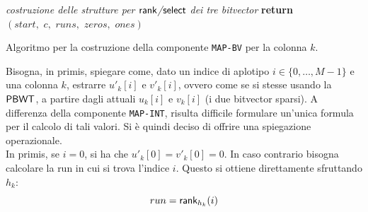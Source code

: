 \begin{algorithm}
\begin{algorithmic}[1]
    \State \textit{costruzione delle strutture per $\mbox{\rm {\sf rank}}$/$\mbox{\rm {\sf select}}$ dei tre
    bitvector} 
    \State \textbf{return}
    $(start,\,\,c,\,\,runs,\,\,zeros,\,\,ones)$  
    \EndFunction
  \end{algorithmic}
  \caption{\footnotesize{Algoritmo per la costruzione della componente
  \texttt{MAP-BV} per la colonna $k$.}}
  \label{algo:cosbv}
\end{algorithm}
Bisogna, in primis, spiegare come, dato un indice di aplotipo
$i\in\{0,\ldots,M-1\}$ e una 
colonna $k$, estrarre $u'_k[i]$ e $v'_k[i]$, ovvero come se si stesse usando la
$\mbox{\rm {\sf PBWT}}$, a partire dagli attuali $u_k[i]$ e $v_k[i]$ (i due bitvector
sparsi). A differenza della componente \texttt{MAP-INT}, risulta difficile
formulare un'unica formula per il calcolo di tali valori. Si è quindi deciso di
offrire una spiegazione operazionale.\\
In primis, 
se $i=0$, si ha che $u'_k[0]=v'_k[0]=0$. In caso contrario bisogna 
calcolare la run 
in cui si trova l'indice $i$. Questo si ottiene direttamente sfruttando $h_k$:
\begin{equation}
  \label{eq:bv7}
  run = \mbox{\rm {\sf rank}}_{h_k}(i)
\end{equation}
